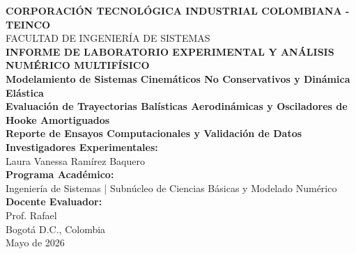 \documentclass[11pt,a4paper]{article}
\begin{document}
	
	\begin{titlepage}
		\centering
		\vspace*{1cm}
		{\large\bfseries CORPORACIÓN TECNOLÓGICA INDUSTRIAL COLOMBIANA - TEINCO} \\[0.3cm]
		{\large FACULTAD DE INGENIERÍA DE SISTEMAS} \\[2.5cm]
		
		{\color{teincoblue}\Huge\bfseries INFORME DE LABORATORIO EXPERIMENTAL Y ANÁLISIS NUMÉRICO MULTIFÍSICO} \\[0.8cm]
		{\color{accentblue}\Large\bfseries Modelamiento de Sistemas Cinemáticos No Conservativos y Dinámica Elástica} \\[0.5cm]
		{\large\bfseries Evaluación de Trayectorias Balísticas Aerodinámicas y Osciladores de Hooke Amortiguados} \\[1cm]
		{\normalsize\bfseries Reporte de Ensayos Computacionales y Validación de Datos} \\[2.5cm]
		
		\textbf{Investigadores Experimentales:} \\
		Laura Vanessa Ramírez Baquero \\
	
		
		\textbf{Programa Académico:} \\
		Ingeniería de Sistemas | Subnúcleo de Ciencias Básicas y Modelado Numérico \\[1.5cm]
		
		\textbf{Docente Evaluador:} \\
		Prof. Rafael \\[2cm]
		
		\vfill
		{\large Bogotá D.C., Colombia \\ Mayo de 2026}
	\end{titlepage}
	
	\tableofcontents
	\clearpage
	
	
\end{document}
